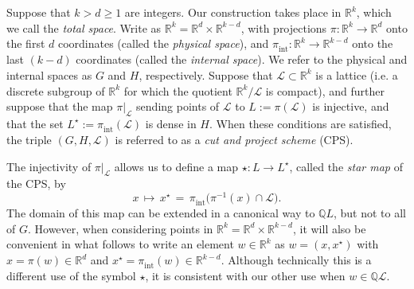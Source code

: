 \documentclass[reqno]{amsart}
\newcommand{\R}{\mathbb{R}}
\newcommand{\Q}{\mathbb{Q}}
\newcommand{\rar}{\rightarrow}
\newcommand{\cL}{\mathcal{L}}
\begin{document}
Suppose that $k>d\ge 1$ are integers. Our construction takes place in $\R^k$, which we call the \textit{total space}. Write as $\R^k=\R^d {\times}  \R^{k-d}$, with projections
$\pi\colon \R^k\rar\R^d$ onto the first $d$ coordinates (called the
\textit{physical space}), and $\pi^{}_{\mathrm{int}}\colon \R^k\rar\R^{k-d}$ onto the last $(k-d)$
coordinates (called the \textit{internal space}). We refer to the physical and internal spaces as $G$ and $H$, respectively. Suppose that $\cL\subset\R^k$ is a lattice (i.e. a discrete subgroup of $\R^k$ for which the quotient $\R^k/\cL$ is compact), and further suppose that the map $\pi|^{}_{\cL}$ sending points of $\cL$ to $L:= \pi(\cL)$ is injective, and that the set $L^{\star}:=\pi^{}_{\mathrm{int}}(\cL)$ is dense in $H$. When these conditions are satisfied, the triple $(G,H,\cL)$ is referred to as a \emph{cut and project scheme} (CPS).

The injectivity of $\pi|_\cL$ allows us to define a map $\star\colon L\rar L^{\star}$, called the \emph{star map} of the CPS, by
\begin{equation*}
	x\, \mapsto\, x^{\star} \, = \, \pi^{}_{\mathrm{int}}
	\bigl( \pi^{-1}(x)\cap\cL \bigr) .
\end{equation*}
The domain of this map can be extended in a canonical way to $\Q L$, but not to all of $G$. However, when considering points in $\R^k=\R^d {\times} \R^{k-d}$, it will also be convenient in what follows to write an element $w\in\R^k$ as $w=(x,x^{\star})$ with $x=\pi(w)\in\R^d$ and $x^{\star}=\pi^{}_{\mathrm{int}}(w)\in\R^{k-d}$. Although technically this is a different use of the symbol $\star$, it is consistent with our other use when $w\in\Q\cL$.
\end{document}
